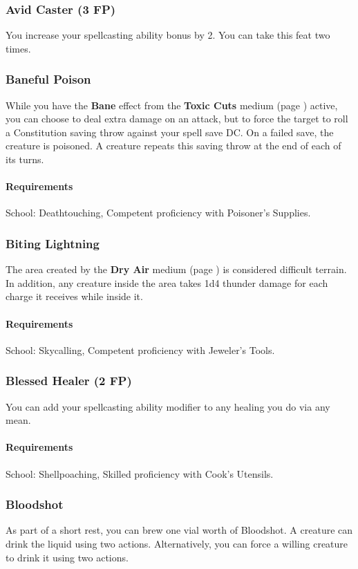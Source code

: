 \subsubsection{Avid Caster (3 FP)} \label{feat::avidcaster}
    You increase your spellcasting ability bonus by 2.
    You can take this feat two times.
\subsubsection{Baneful Poison} \label{feat::banefulpoison}
    While you have the \textbf{Bane} effect from the \textbf{Toxic Cuts} medium (page \pageref{medium::toxiccuts}) active, you can choose to deal extra damage on an attack, but to force the target to roll a Constitution saving throw against your spell save DC.
    On a failed save, the creature is poisoned.
    A creature repeats this saving throw at the end of each of its turns.
    \paragraph{Requirements} School: Deathtouching, Competent proficiency with Poisoner's Supplies.
\subsubsection{Biting Lightning} \label{feat::bitinglightning}
    The area created by the \textbf{Dry Air} medium (page \pageref{medium::dryair}) is considered difficult terrain.
    In addition, any creature inside the area takes 1d4 thunder damage for each charge it receives while inside it.
    \paragraph{Requirements} School: Skycalling, Competent proficiency with Jeweler's Tools.
\subsubsection{Blessed Healer (2 FP)} \label{feat::blessedhealer}
    You can add your spellcasting ability modifier to any healing you do via any mean.
    \paragraph{Requirements} School: Shellpoaching, Skilled proficiency with Cook's Utensils.
\subsubsection{Bloodshot} \label{feat::bloodshot}
    As part of a short rest, you can brew one vial worth of Bloodshot.
    A creature can drink the liquid using two actions.
    Alternatively, you can force a willing creature to drink it using two actions.

